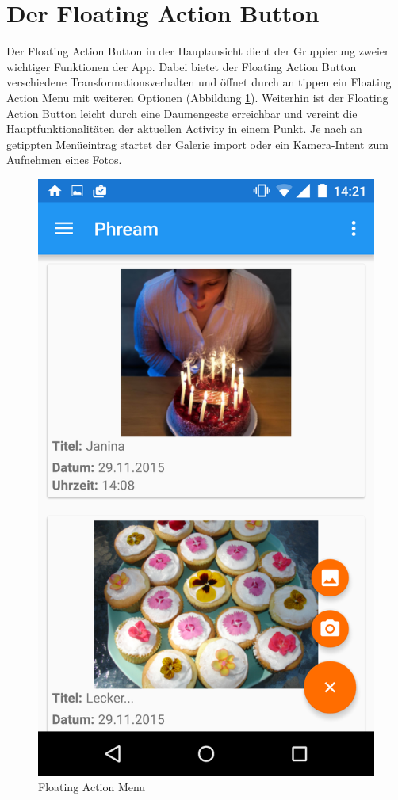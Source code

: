 \section{Der Floating Action Button}
Der Floating Action Button in der Hauptansicht dient der Gruppierung zweier wichtiger Funktionen der App. Dabei bietet der Floating Action Button verschiedene Transformationsverhalten und öffnet durch an tippen ein Floating Action Menu mit weiteren Optionen (Abbildung \ref{label:floatingaction_menu}). Weiterhin ist der Floating Action Button leicht durch eine Daumengeste erreichbar und vereint die Hauptfunktionalitäten der aktuellen Activity in einem Punkt. Je nach an getippten Menüeintrag startet der Galerie import oder ein Kamera-Intent zum Aufnehmen eines Fotos.

\begin{figure}[H]
\centering
\includegraphics[scale=0.1]{images/screenshots/floatingaction_menu.png}
\caption{Floating Action Menu}
\label{label:floatingaction_menu}
\end{figure}

